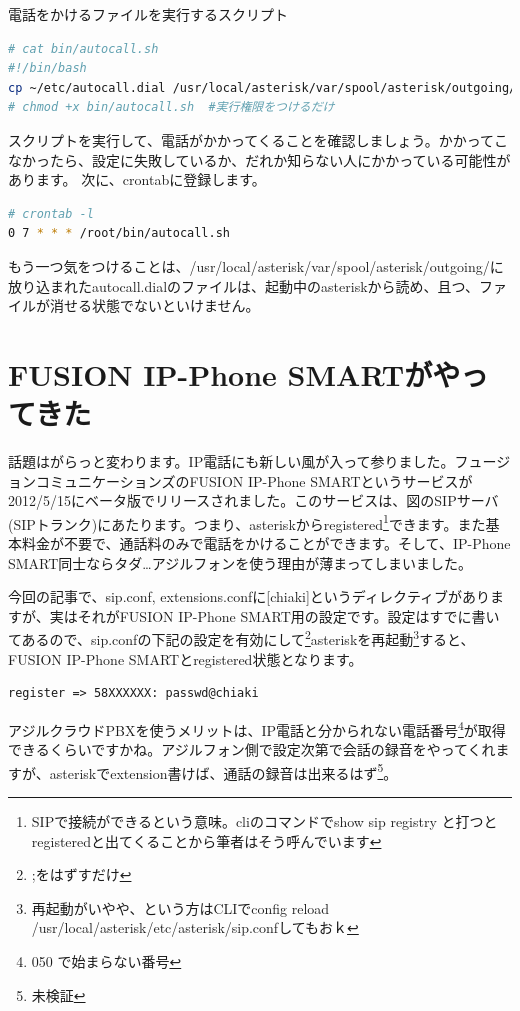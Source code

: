 電話をかけるファイルを実行するスクリプト

\begin{lstlisting}[language=bash]
# cat bin/autocall.sh 
#!/bin/bash
cp ~/etc/autocall.dial /usr/local/asterisk/var/spool/asterisk/outgoing/
# chmod +x bin/autocall.sh  #実行権限をつけるだけ
\end{lstlisting}
スクリプトを実行して、電話がかかってくることを確認しましょう。かかってこなかったら、設定に失敗しているか、だれか知らない人にかかっている可能性があります。
次に、crontabに登録します。
\begin{lstlisting}[language=bash]
# crontab -l 
0 7 * * * /root/bin/autocall.sh
\end{lstlisting}

もう一つ気をつけることは、/usr/local/asterisk/var/spool/asterisk/outgoing/に放り込まれたautocall.dialのファイルは、起動中のasteriskから読め、且つ、ファイルが消せる状態でないといけません。

\section{FUSION IP-Phone SMARTがやってきた}
話題はがらっと変わります。IP電話にも新しい風が入って参りました。フュージョンコミュニケーションズのFUSION IP-Phone SMARTというサービスが2012/5/15にベータ版でリリースされました。このサービスは、図のSIPサーバ(SIPトランク)にあたります。つまり、asteriskからregistered\footnote{SIPで接続ができるという意味。cliのコマンドでshow sip registry と打つとregisteredと出てくることから筆者はそう呼んでいます}できます。また基本料金が不要で、通話料のみで電話をかけることができます。そして、IP-Phone SMART同士ならタダ…アジルフォンを使う理由が薄まってしまいました。

今回の記事で、sip.conf, extensions.confに[chiaki]というディレクティブがありますが、実はそれがFUSION IP-Phone SMART用の設定です。設定はすでに書いてあるので、sip.confの下記の設定を有効にして\footnote{;をはずすだけ}asteriskを再起動\footnote{再起動がいやや、という方はCLIでconfig reload /usr/local/asterisk/etc/asterisk/sip.confしてもおｋ}すると、FUSION IP-Phone SMARTとregistered状態となります。

\begin{lstlisting}
register => 58XXXXXX: passwd@chiaki
\end{lstlisting}

アジルクラウドPBXを使うメリットは、IP電話と分かられない電話番号\footnote{050 で始まらない番号}が取得できるくらいですかね。アジルフォン側で設定次第で会話の録音をやってくれますが、asteriskでextension書けば、通話の録音は出来るはず\footnote{未検証}。

